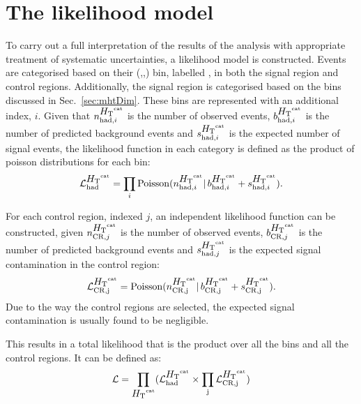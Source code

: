 \section{The likelihood model}  %
\label{sec:likelihood}

To carry out a full interpretation of the results of the analysis with
appropriate treatment of systematic uncertainties, a likelihood model
is constructed. Events are categorised based on their (\HT,\nj,\nb)
bin, labelled \htcat, in both the signal region and control regions. Additionally, the
signal region is categorised based on the \MHT bins discussed in
Sec.~\ref{sec:mhtDim}. These bins are represented with an additional
index, $i$. Given
that $n^{\mbox{$H_\text{T}$}^{\text{cat}}}_{\mathrm{had},i}$ is the number of observed events,
$b^{\mbox{$H_\text{T}$}^{\text{cat}}}_{\mathrm{had},i}$ is the number of predicted background
events and $s^{\mbox{$H_\text{T}$}^{\text{cat}}}_{\mathrm{had},i}$ is the expected number of
signal events, the likelihood function in each \htcat category is
defined as the product of poisson distributions for each \MHT bin:
\begin{equation}
\mathcal{L}^{\mbox{$H_\text{T}$}^{\text{cat}}}_{\mathrm{had}}=\prod_i
\mathrm{Poisson}(n^{\mbox{$H_\text{T}$}^{\text{cat}}}_{\mathrm{had},i} |\,
b^{\mbox{$H_\text{T}$}^{\text{cat}}}_{\mathrm{had},i} + s^{\mbox{$H_\text{T}$}^{\text{cat}}}_{\mathrm{had},i}).
\label{eq:hadronicLikelihood}
\end{equation}

For each control region, indexed $j$, an independent likelihood
function can be constructed, given $n^{\mbox{$H_\text{T}$}^{\text{cat}}}_{\mathrm{CR},j}$ is
the number of observed events, $b^{\mbox{$H_\text{T}$}^{\text{cat}}}_{\mathrm{CR},j}$ is the
number of predicted background events and
$s^{\mbox{$H_\text{T}$}^{\text{cat}}}_{\mathrm{had},j}$ is the expected signal contamination in
the control region:
\begin{equation}
\mathcal{L}^{\mbox{$H_\text{T}$}^{\text{cat}}}_{\mathrm{CR,j}}=\mathrm{Poisson}(n^{\mbox{$H_\text{T}$}^{\text{cat}}}_{\mathrm{CR,j}}
|\, b^{\mbox{$H_\text{T}$}^{\text{cat}}}_{\mathrm{CR,j}} + s^{\mbox{$H_\text{T}$}^{\text{cat}}}_{\mathrm{CR,j}}).
\label{eq:controlLikelihood}
\end{equation}
Due to the way the control regions are selected, the expected signal
contamination is usually found to be negligible.

This results in a total likelihood that is the product over all the
\htcat bins and all the control regions. It can be defined as:
\begin{equation}
\label{eq:total_likelihood}
\mathcal{L} = \prod_{\mbox{$H_\text{T}$}^{\text{cat}}} (\mathcal{L}_{\text{had}}^{\mbox{$H_\text{T}$}^{\text{cat}}} \times
\prod_{\text{j}} \mathcal{L}_{\text{CR,j}}^{\mbox{$H_\text{T}$}^{\text{cat}}})
\end{equation}

